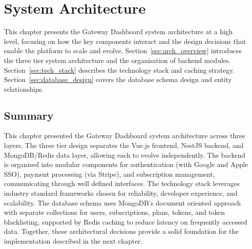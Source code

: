 \chapter{System Architecture}
\label{chap:architecture}

This chapter presents the Gateway Dashboard system architecture at a high level, focusing on how the key components interact and the design decisions that enable the platform to scale and evolve. Section~\ref{sec:arch_overview} introduces the three tier system architecture and the organisation of backend modules. Section~\ref{sec:tech_stack} describes the technology stack and caching strategy. Section~\ref{sec:database_design} covers the database schema design and entity relationships.





\section{Summary}

This chapter presented the Gateway Dashboard system architecture across three layers. The three tier design separates the Vue.js frontend, NestJS backend, and MongoDB/Redis data layer, allowing each to evolve independently. The backend is organised into modular components for authentication (with Google and Apple SSO), payment processing (via Stripe), and subscription management, communicating through well defined interfaces. The technology stack leverages industry standard frameworks chosen for reliability, developer experience, and scalability. The database schema uses MongoDB's document oriented approach with separate collections for users, subscriptions, plans, tokens, and token blacklisting, supported by Redis caching to reduce latency on frequently accessed data. Together, these architectural decisions provide a solid foundation for the implementation described in the next chapter.
